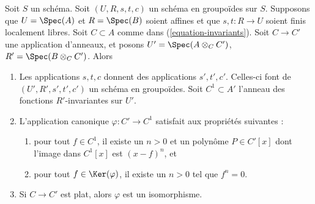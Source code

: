 \begin{lemma}
\label{lemma-invariants-base-change}
Soit $S$ un schéma. Soit $(U, R, s, t, c)$ un schéma en groupoïdes sur $S$.
Supposons que $U = \Spec(A)$ et $R = \Spec(B)$ soient affines et que
$s, t : R \to U$ soient finis localement libres. Soit $C \subset A$ comme dans
(\ref{equation-invariants}). Soit $C \to C'$ une application d'anneaux, et posons
$U' = \Spec(A \otimes_C C')$,
$R' = \Spec(B \otimes_C C')$.
Alors
\begin{enumerate}
\item Les applications $s, t, c$ donnent des applications $s', t', c'$.
Celles-ci font de $(U', R', s', t', c')$ un schéma en groupoïdes. Soit $C^1 \subset A'$
l'anneau des fonctions $R'$-invariantes sur $U'$.
\item L'application canonique $\varphi : C' \to C^1$ satisfait aux propriétés suivantes :
\begin{enumerate}
\item pour tout $f \in C^1$, il existe un $n > 0$ et un
polynôme $P \in C'[x]$ dont l'image dans $C^1[x]$ est
$(x - f)^n$, et
\item pour tout $f \in \Ker(\varphi)$, il existe
un $n > 0$ tel que $f^n = 0$.
\end{enumerate}
\item Si $C \to C'$ est plat, alors $\varphi$ est un isomorphisme.
\end{enumerate}
\end{lemma}

